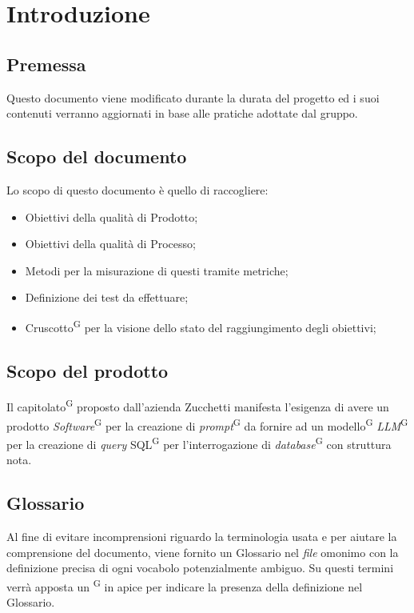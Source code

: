 \documentclass[5pt]{article}
\begin{document}
	\pagebreak
	
	\section{Introduzione}
	
	\subsection{Premessa}
	Questo documento viene modificato durante la durata del progetto ed i suoi contenuti verranno aggiornati in base alle pratiche adottate dal gruppo.
	
	\subsection{Scopo del documento}
	Lo scopo di questo documento è quello di raccogliere:
	\begin{itemize}
		\item Obiettivi della qualità di Prodotto;
		\item Obiettivi della qualità di Processo;
		\item Metodi per la misurazione di questi tramite metriche;
		\item Definizione dei test da effettuare;
		\item Cruscotto\textsuperscript{G} per la visione dello stato del raggiungimento degli obiettivi;
	\end{itemize}
	
	\subsection{Scopo del prodotto}
	Il capitolato\textsuperscript{G} proposto dall'azienda Zucchetti manifesta l'esigenza di avere un prodotto \textit{Software}\textsuperscript{G} per la creazione di \textit{prompt}\textsuperscript{G} da fornire ad un modello\textsuperscript{G} \textit{LLM}\textsuperscript{G} per la creazione di \textit{query} SQL\textsuperscript{G} per l'interrogazione di \textit{database}\textsuperscript{G} con struttura nota.
	
	\subsection{Glossario}
	Al fine di evitare incomprensioni riguardo la terminologia usata e per aiutare la comprensione del documento,
	viene fornito un Glossario nel \textit{file} omonimo con la definizione precisa di ogni vocabolo potenzialmente ambiguo. Su questi termini verrà apposta un \textsuperscript{G} in apice per indicare la presenza della definizione nel Glossario.
	
\end{document}
